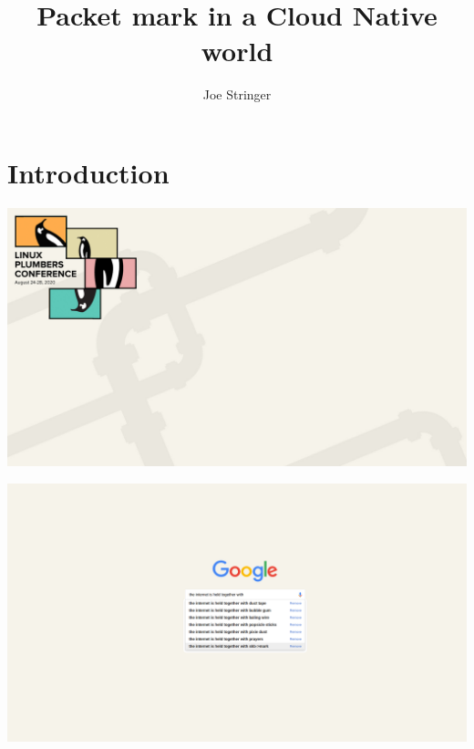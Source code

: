 \documentclass[black,white,aspectratio=169]{beamer}
\title[Packet mark in a Cloud Native world]{Packet mark in a Cloud Native world}
\institute{Cilium.io}
\author[Joe Stringer]{Joe Stringer}
\date[August 24, 2020]{}
\DeclareRobustCommand{\#}{\adjustbox{valign=B,totalheight=.57\baselineskip}{\oldhash}}%
\begin{document}
    \section*{Introduction}
    {
        \usebackgroundtemplate%
        {%
          \includegraphics[width=\paperwidth,height=\paperheight]{background.jpg}%
        }
        \begin{frame}[plain]
            \vspace*{8ex}
            \titlepage
        \end{frame}

    }

    {
        \usebackgroundtemplate%
        {%
          \includegraphics[width=\paperwidth,height=\paperheight]{internet.png}%
        }
        \begin{frame}
        \end{frame}
    }
\end{document}
